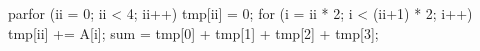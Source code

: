 parfor (ii = 0; ii < 4; ii++)
  tmp[ii] = 0;
  for (i = ii * 2; i < (ii+1) * 2; i++)
    tmp[ii] += A[i];
sum = tmp[0] + tmp[1] + tmp[2] + tmp[3];
